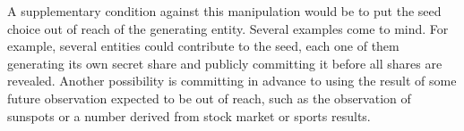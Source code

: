 \documentclass{article}
\begin{document}
A supplementary condition against this manipulation
would be to put the seed choice out of reach of the generating entity.
Several examples come to mind.
For example, several entities could contribute to the seed,
each one of them generating its own secret share
and publicly committing it before all shares are revealed.
Another possibility is committing in advance to using
the result of some future observation expected to be out of reach,
such as the observation of sunspots
or a number derived from stock market or sports results.



\end{document}
